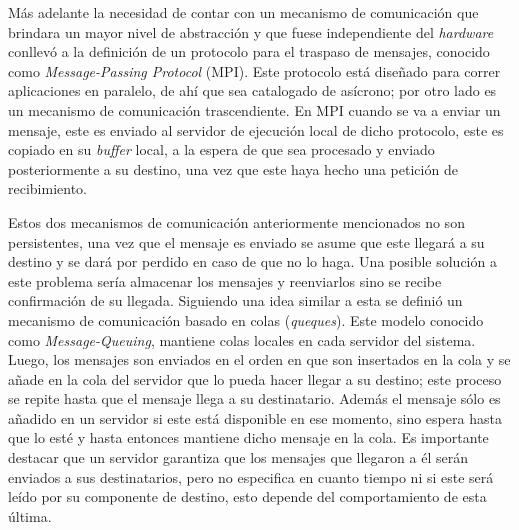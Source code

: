 Más adelante la necesidad de contar con un mecanismo de comunicación que
brindara un mayor nivel de abstracción y que fuese independiente del
\textit{hardware} conllevó a la definición de un protocolo para el traspaso de
mensajes, conocido como \emph{Message-Passing Protocol} (MPI)\cite{Snir1996}.
Este protocolo está diseñado para correr aplicaciones en paralelo, de ahí que
sea catalogado de asícrono; por otro lado es un mecanismo de comunicación
trascendiente. En MPI cuando se va a enviar un mensaje, este es enviado al
servidor de ejecución local de dicho protocolo, este es copiado en su
\textit{buffer} local, a la espera de que sea procesado y enviado posteriormente
a su destino, una vez que este haya hecho una petición de
recibimiento\cite{Tanenbaum2007}.
 
Estos dos mecanismos de comunicación anteriormente mencionados no son
persistentes, una vez que el mensaje es enviado se asume que este llegará a su
destino y se dará por perdido en caso de que no lo haga. Una posible solución a
este problema sería almacenar los mensajes y reenviarlos sino se recibe
confirmación de su llegada. Siguiendo una idea similar a esta se definió un
mecanismo de comunicación basado en colas (\textit{queques}). Este modelo
conocido como \emph{Message-Queuing}, mantiene colas locales en cada servidor
del sistema. Luego, los mensajes son enviados en el orden en que son insertados
en la cola y se añade en la cola del servidor que lo pueda hacer llegar a su
destino; este proceso se repite hasta que el mensaje llega a su destinatario.
Además el mensaje sólo es añadido en un servidor si este está disponible en ese
momento, sino espera hasta que lo esté y hasta entonces mantiene dicho mensaje
en la cola. Es importante destacar que un servidor garantiza que los mensajes
que llegaron a él serán enviados a sus destinatarios, pero no especifica en
cuanto tiempo ni si este será leído por su componente de destino, esto depende
del comportamiento de esta última\cite{Tanenbaum2007}.
